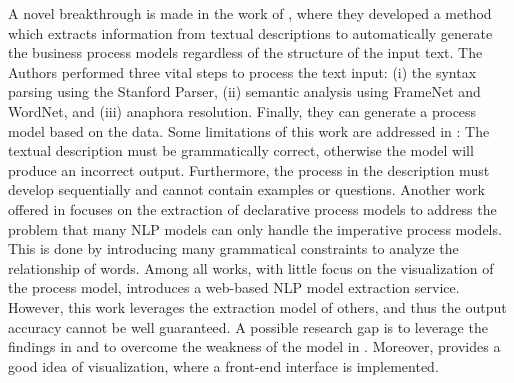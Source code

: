 	A novel breakthrough is made in the work of \cite{t2m_1}, where they developed a method which extracts information from textual descriptions to automatically generate the business process models regardless of the structure of the input text. The Authors performed three vital steps to process the text input: (i) the syntax parsing using the Stanford Parser, (ii) semantic analysis using FrameNet and WordNet, and (iii) anaphora resolution. Finally, they can generate a process model based on the data. Some limitations of this work are addressed in \cite{pre_processing_1}: The textual description must be grammatically correct, otherwise the model will produce an incorrect output. Furthermore, the process in the description must develop sequentially and cannot contain examples or questions. Another work offered in \cite{t2m_2} focuses on the extraction of declarative process models to address the problem that many NLP models can only handle the imperative process models. This is done by introducing many grammatical constraints to analyze the relationship of words. Among all works, with little focus on the visualization of the process model, \cite{complement_1} introduces a web-based NLP model extraction service. However, this work leverages the extraction model of others, and thus the output accuracy cannot be well guaranteed. A possible research gap is to leverage the findings in \cite{pre_processing_1} and \cite{t2m_2} to overcome the weakness of the model in \cite{t2m_1}. Moreover, \cite{complement_1} provides a good idea of visualization, where a front-end interface is implemented.
	
	
	
	
	
	
	